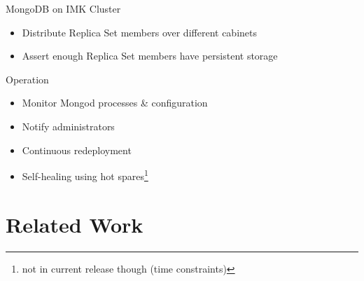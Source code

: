 \documentclass[11pt,aspectratio=169]{beamer}
\begin{document}
\begin{frame}[allowframebreaks]{MongoDB on IMK Cluster}
        \begin{itemize}
            \item Distribute Replica Set members over different cabinets
            \item Assert enough Replica Set members have persistent storage
        \end{itemize}
        
        \begin{figure}
            \centering
        \end{figure}
        
        \framebreak
        
        Operation
        
        \begin{itemize}
           \item Monitor Mongod processes \& configuration
           \item Notify administrators
           \item Continuous redeployment
           \item Self-healing using hot spares\footnote{not in current release though (time constraints)}
        \end{itemize}
        
    \end{frame}
    
    \section{Related Work}
    
\end{document}
